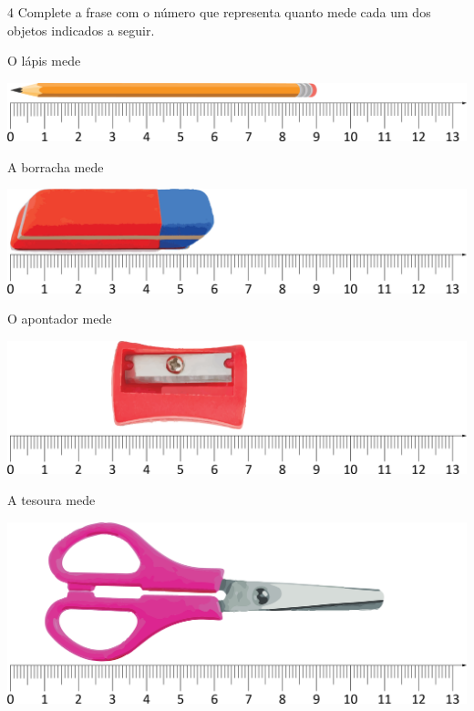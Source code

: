 \num{4} Complete a frase com o número que representa quanto mede cada um dos
objetos indicados a seguir.

\begin{escolha}

\item O lápis mede 

\noindent\includegraphics[width=\textwidth]{./media/image42.png}

\item A borracha mede 

\noindent\includegraphics[width=\textwidth]{./media/image43.png}

\item O apontador mede 

\noindent\includegraphics[width=\textwidth]{./media/image44.png}

\item A tesoura mede 

\noindent\includegraphics[width=\textwidth]{./media/image45.png}
\end{escolha}

